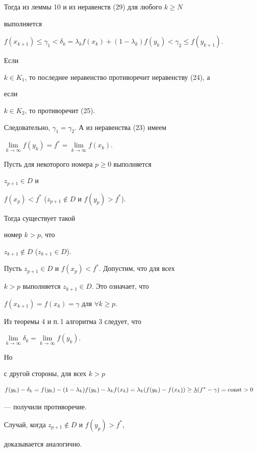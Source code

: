 \begin{pf}
 


Тогда из леммы 10 и из неравенств (29) для любого $k\ge N$ 


выполняется 


$f(x_{k+1})\le\gamma_1<\delta_k=\lambda_k 


f(x_k)+(1-\lambda_k)f(y_k)<\gamma_2\le f(y_{k+1})$. 


Если 


$k\in K_1$, то последнее неравенство противоречит неравенству (24), а 


если 


$k\in K_2$, то противоречит (25). 


 


Следовательно, $\gamma_1=\gamma_2$. А из неравенства (23) имеем 


$\lim\limits_{k\to\infty}f(y_k)=f^*= 


\lim\limits_{k\to\infty}f(x_k)$. 


\end{pf} 


 


\begin{cornonum} Пусть для некоторого номера $p\ge 0$ выполняется 


$z_{p+1}\in D$ и 


$f(x_p)<f^*$ ($z_{p+1}\notin D$ и $f(y_p)>f^*$). 


Тогда существует такой 


номер $k>p$, что 


$z_{k+1}\notin D$ ($z_{k+1}\in D$). 


\end{cornonum} 


 


\begin{pf} Пусть $z_{p+1}\in D$ и $f(x_p)<f^*$. Допустим, что для всех 


$k>p$ выполняется $z_{k+1}\in D$. Это означает, что 


$f(x_{k+1})=f(x_k)=\gamma$ для $\forall k\ge p$. 


Из теоремы 4 и п.\,1 алгоритма 3 следует, что 


$\lim\limits_{k\to\infty}\delta_k=\lim\limits_{k\to\infty}f(y_k)$. 


Но 


с другой стороны, для всех $k>p$ 


$$ 


f(y_k)-\delta_k=f(y_k)-(1-\lambda_k)f(y_k)-\lambda_k 


f(x_k)=\lambda_k(f(y_k)-f(x_k))\ge 


\ul\lambda(f^*-\gamma)=\const>0 


$$ 


--- получили противоречие. 


 


Случай, когда $z_{p+1}\notin D$ и $f(y_p)>f^*$, 


доказывается аналогично. 


\end{pf} 



